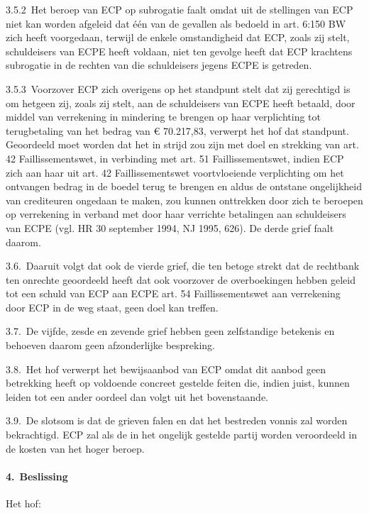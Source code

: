 \documentclass[
  dutch,
  a4paper,
]{article}
\begin{document}
3.5.2 Het beroep van ECP op subrogatie faalt omdat uit de stellingen van ECP niet kan worden afgeleid dat één van de gevallen als bedoeld in art. 6:150 BW zich heeft voorgedaan, terwijl de enkele omstandigheid dat ECP, zoals zij stelt, schuldeisers van ECPE heeft voldaan, niet ten gevolge heeft dat ECP krachtens subrogatie in de rechten van die schuldeisers jegens ECPE is getreden.

3.5.3 Voorzover ECP zich overigens op het standpunt stelt dat zij gerechtigd is om hetgeen zij, zoals zij stelt, aan de schuldeisers van ECPE heeft betaald, door middel van verrekening in mindering te brengen op haar verplichting tot terugbetaling van het bedrag van € 70.217,83, verwerpt het hof dat standpunt. Geoordeeld moet worden dat het in strijd zou zijn met doel en strekking van art. 42 Faillissementswet, in verbinding met art. 51 Faillissementswet, indien ECP zich aan haar uit art. 42 Faillissementswet voortvloeiende verplichting om het ontvangen bedrag in de boedel terug te brengen en aldus de ontstane ongelijkheid van crediteuren ongedaan te maken, zou kunnen onttrekken door zich te beroepen op verrekening in verband met door haar verrichte betalingen aan schuldeisers van ECPE (vgl. HR 30 september 1994, NJ 1995, 626). De derde grief faalt daarom.

3.6. Daaruit volgt dat ook de vierde grief, die ten betoge strekt dat de rechtbank ten onrechte geoordeeld heeft dat ook voorzover de overboekingen hebben geleid tot een schuld van ECP aan ECPE art. 54 Faillissementswet aan verrekening door ECP in de weg staat, geen doel kan treffen.

3.7. De vijfde, zesde en zevende grief hebben geen zelfstandige betekenis en behoeven daarom geen afzonderlijke bespreking.

3.8. Het hof verwerpt het bewijsaanbod van ECP omdat dit aanbod geen betrekking heeft op voldoende concreet gestelde feiten die, indien juist, kunnen leiden tot een ander oordeel dan volgt uit het bovenstaande.

3.9. De slotsom is dat de grieven falen en dat het bestreden vonnis zal worden bekrachtigd. ECP zal als de in het ongelijk gestelde partij worden veroordeeld in de kosten van het hoger beroep.

\paragraph{4. Beslissing}\label{beslissing}

Het hof:
\end{document}
